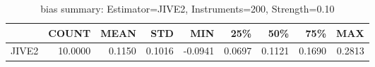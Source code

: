 \begin{table}[ht]
\centering
\caption{bias summary: Estimator=JIVE2, Instruments=200, Strength=0.10}
\begin{tabular}{lrrrrrrrr}
\toprule
 & COUNT & MEAN & STD & MIN & 25\% & 50\% & 75\% & MAX \\
\midrule
JIVE2 & 10.0000 & 0.1150 & 0.1016 & -0.0941 & 0.0697 & 0.1121 & 0.1690 & 0.2813 \\
\bottomrule
\end{tabular}
\end{table}
